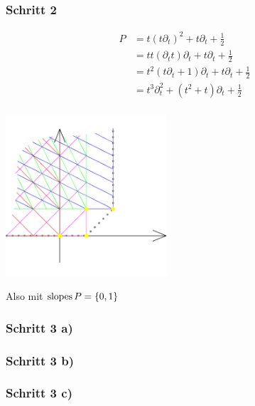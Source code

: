 \subsubsection{Schritt 2}
\begin{minipage}[hbt]{0,39\textwidth}
  \begin{align*}
   P &= t(t\partial_t)^2                + t\partial_t           + \frac{1}{2}\\
     &= tt(\partial_tt)\partial_t       + t\partial_t           + \frac{1}{2}\\
     &= t^2(t\partial_t + 1)\partial_t  + t\partial_t           + \frac{1}{2}\\
     &= t^3\partial_t^2                 + (t^2 + t)\partial_t   + \frac{1}{2}\\
  \end{align*}
\end{minipage}
\begin{minipage}[hbt]{0,59\textwidth}
  \begin{center}
    \includegraphics[width=6cm]{img/formal_a-2.png}
  \end{center}
\end{minipage}
Also mit $\operatorname{slopes}{P}=\{0,1\}$

\subsubsection{Schritt 3 a)}
\subsubsection{Schritt 3 b)}
\subsubsection{Schritt 3 c)}


